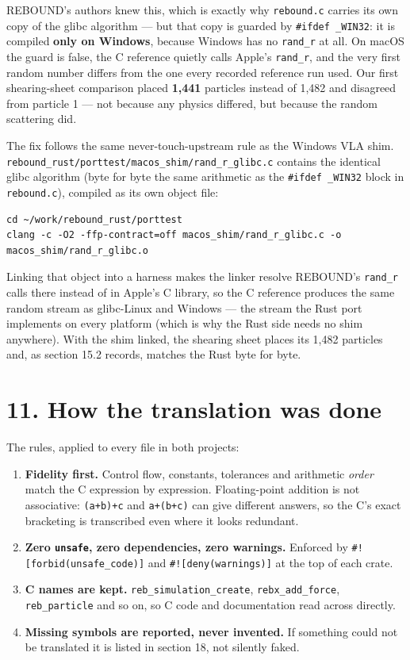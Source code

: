 \documentclass[11pt]{article}
\begin{document}
REBOUND's authors knew this, which is exactly why \texttt{rebound.c} carries its own copy of the glibc algorithm --- but that copy is guarded by \texttt{\#ifdef \_WIN32}: it is compiled \textbf{only on Windows}, because Windows has no \texttt{rand\_r} at all. On macOS the guard is false, the C reference quietly calls Apple's \texttt{rand\_r}, and the very first random number differs from the one every recorded reference run used. Our first shearing-sheet comparison placed \textbf{1,441} particles instead of 1,482 and disagreed from particle 1 --- not because any physics differed, but because the random scattering did.

The fix follows the same never-touch-upstream rule as the Windows VLA shim. \texttt{rebound\_rust/porttest/macos\_shim/rand\_r\_glibc.c} contains the identical glibc algorithm (byte for byte the same arithmetic as the \texttt{\#ifdef \_WIN32} block in \texttt{rebound.c}), compiled as its own object file:

\begin{lstlisting}
cd ~/work/rebound_rust/porttest
clang -c -O2 -ffp-contract=off macos_shim/rand_r_glibc.c -o macos_shim/rand_r_glibc.o
\end{lstlisting}

Linking that object into a harness makes the linker resolve REBOUND's \texttt{rand\_r} calls there instead of in Apple's C library, so the C reference produces the same random stream as glibc-Linux and Windows --- the stream the Rust port implements on every platform (which is why the Rust side needs no shim anywhere). With the shim linked, the shearing sheet places its 1,482 particles and, as section 15.2 records, matches the Rust byte for byte.

\section{11. How the translation was done}

The rules, applied to every file in both projects:

\begin{enumerate}
\item \textbf{Fidelity first.} Control flow, constants, tolerances and arithmetic \emph{order} match the C expression by expression. Floating-point addition is not associative: \texttt{(a+b)+c} and \texttt{a+(b+c)} can give different answers, so the C's exact bracketing is transcribed even where it looks redundant.
\item \textbf{Zero \texttt{unsafe}, zero dependencies, zero warnings.} Enforced by \texttt{\#![forbid(unsafe\_code)]} and \texttt{\#![deny(warnings)]} at the top of each crate.
\item \textbf{C names are kept.} \texttt{reb\_simulation\_create}, \texttt{rebx\_add\_force}, \texttt{reb\_particle} and so on, so C code and documentation read across directly.
\item \textbf{Missing symbols are reported, never invented.} If something could not be translated it is listed in section 18, not silently faked.
\end{enumerate}
\end{document}
